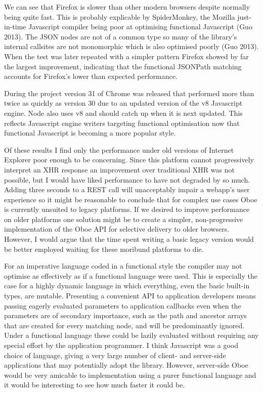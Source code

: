 \documentclass[12pt, ]{article}
\begin{document}
We can see that Firefox is slower than other modern browsers despite
normally being quite fast. This is probably explicable by SpiderMonkey,
the Mozilla just-in-time Javascript compiler being poor at optimising
functional Javascript (Guo 2013). The JSON nodes are not of a common
type so many of the library's internal callsites are not monomorphic
which is also optimised poorly (Guo 2013). When the test was later
repeated with a simpler pattern Firefox showed by far the largest
improvement, indicating that the functional JSONPath matching accounts
for Firefox's lower than expected performance.

During the project version 31 of Chrome was released that performed more
than twice as quickly as version 30 due to an updated version of the v8
Javascript engine. Node also uses v8 and should catch up when it is next
updated. This reflects Javascript engine writers targeting functional
optimisation now that functional Javascript is becoming a more popular
style.

Of these results I find only the performance under old versions of
Internet Explorer poor enough to be concerning. Since this platform
cannot progressively interpret an XHR response an improvement over
traditional XHR was not possible, but I would have liked performance to
have not degraded by so much. Adding three seconds to a REST call will
unacceptably impair a webapp's user experience so it might be reasonable
to conclude that for complex use cases Oboe is currently unsuited to
legacy platforms. If we desired to improve performance on older
platforms one solution might be to create a simpler, non-progressive
implementation of the Oboe API for selective delivery to older browsers.
However, I would argue that the time spent writing a basic legacy
version would be better employed waiting for these moribund platforms to
die.

For an imperative language coded in a functional style the compiler may
not optimise as effectively as if a functional language were used. This
is especially the case for a highly dynamic language in which
everything, even the basic built-in types, are mutable. Presenting a
convenient API to application developers means passing eagerly evaluated
parameters to application callbacks even when the parameters are of
secondary importance, such as the path and ancestor arrays that are
created for every matching node, and will be predominantly ignored.
Under a functional language these could be lazily evaluated without
requiring any special effort by the application programmer. I think
Javascript was a good choice of language, giving a very large number of
client- and server-side applications that may potentially adopt the
library. However, server-side Oboe would be very amicable to
implementation using a purer functional language and it would be
interesting to see how much faster it could be.
\end{document}
